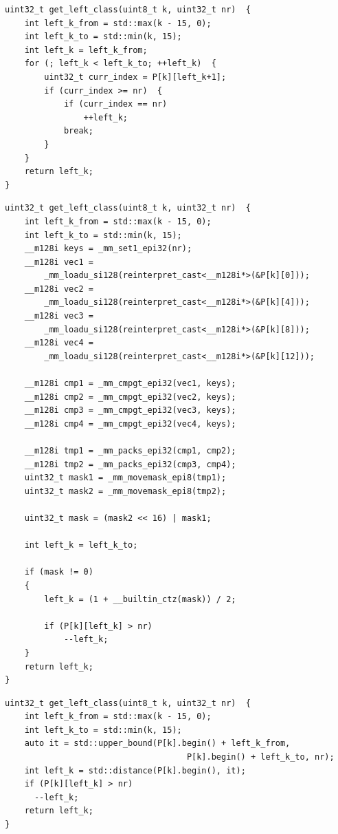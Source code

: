 \begin{lstlisting}
uint32_t get_left_class(uint8_t k, uint32_t nr)  {
	int left_k_from = std::max(k - 15, 0);
	int left_k_to = std::min(k, 15);
	int left_k = left_k_from;
	for (; left_k < left_k_to; ++left_k)  {
		uint32_t curr_index = P[k][left_k+1];
		if (curr_index >= nr)  {
			if (curr_index == nr)
				++left_k;
			break;
		}
	}
	return left_k;
}
\end{lstlisting}

\begin{lstlisting}
uint32_t get_left_class(uint8_t k, uint32_t nr)  {
	int left_k_from = std::max(k - 15, 0);
	int left_k_to = std::min(k, 15);
	__m128i keys = _mm_set1_epi32(nr);
	__m128i vec1 =
		_mm_loadu_si128(reinterpret_cast<__m128i*>(&P[k][0]));
	__m128i vec2 =
		_mm_loadu_si128(reinterpret_cast<__m128i*>(&P[k][4]));
	__m128i vec3 =
		_mm_loadu_si128(reinterpret_cast<__m128i*>(&P[k][8]));
	__m128i vec4 =
		_mm_loadu_si128(reinterpret_cast<__m128i*>(&P[k][12]));

	__m128i cmp1 = _mm_cmpgt_epi32(vec1, keys);
	__m128i cmp2 = _mm_cmpgt_epi32(vec2, keys);
	__m128i cmp3 = _mm_cmpgt_epi32(vec3, keys);
	__m128i cmp4 = _mm_cmpgt_epi32(vec4, keys);

	__m128i tmp1 = _mm_packs_epi32(cmp1, cmp2);
	__m128i tmp2 = _mm_packs_epi32(cmp3, cmp4);
	uint32_t mask1 = _mm_movemask_epi8(tmp1);
	uint32_t mask2 = _mm_movemask_epi8(tmp2);

	uint32_t mask = (mask2 << 16) | mask1;

	int left_k = left_k_to;

	if (mask != 0)
	{
		left_k = (1 + __builtin_ctz(mask)) / 2;

		if (P[k][left_k] > nr)
			--left_k;
	}
	return left_k;
}
\end{lstlisting}

\begin{lstlisting}
uint32_t get_left_class(uint8_t k, uint32_t nr)  {
	int left_k_from = std::max(k - 15, 0);
	int left_k_to = std::min(k, 15);
	auto it = std::upper_bound(P[k].begin() + left_k_from,
                                     P[k].begin() + left_k_to, nr);
    int left_k = std::distance(P[k].begin(), it);
    if (P[k][left_k] > nr)
      --left_k;
	return left_k;
}
\end{lstlisting}

